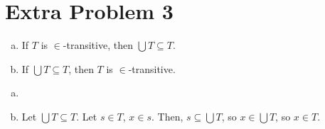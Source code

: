 \documentclass[10pt]{mypackage}
\begin{document}
\RaggedRight
\section{Extra Problem 3}%
\begin{problem}\hfill
  \begin{enumerate}[(a)]
    \item If $T$ is $\in$-transitive, then $\bigcup T \subseteq T$.
    \item If $\bigcup T \subseteq T$, then $T$ is $\in$-transitive.
  \end{enumerate}
\end{problem}
\begin{solution}\hfill
  \begin{enumerate}[(b)]
    \item 
    \item Let $\bigcup T\subseteq T$. Let $s\in T$, $x\in s$. Then, $s\subseteq \bigcup T$, so $x\in \bigcup T$, so $x\in T$.
  \end{enumerate}
\end{solution}
\end{document}
